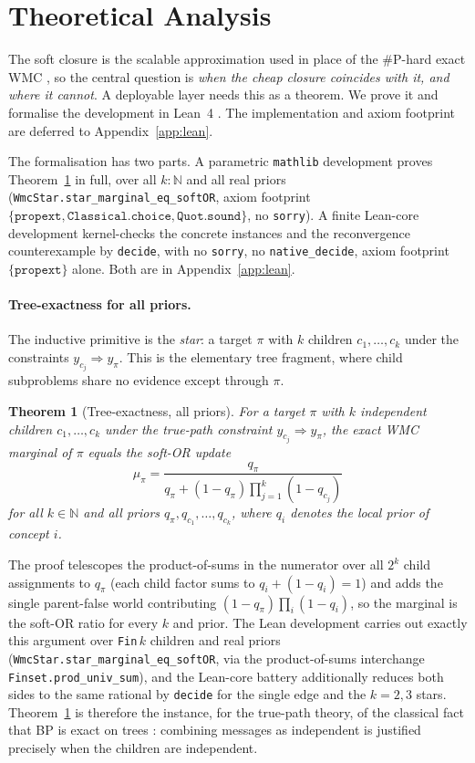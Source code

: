 \documentclass[letterpaper]{article}
\newtheorem{theorem}{Theorem}
\begin{document}
\section{Theoretical Analysis}\label{sec:lean}

The soft closure is the scalable approximation used in place of the \#P-hard exact WMC \citep{chavira2008wmc}, so the central question is \emph{when the cheap closure coincides with it, and where it cannot}. A deployable layer needs this as a theorem. We prove it and formalise the development in Lean~4 \citep{demoura2021lean}. The implementation and axiom footprint are deferred to Appendix~\ref{app:lean}.

The formalisation has two parts. A parametric \texttt{mathlib} development proves
Theorem~\ref{thm:star} in full, over all $k:\mathbb{N}$ and all real priors
(\texttt{WmcStar.star\_marginal\_eq\_softOR}, axiom footprint
$\{\texttt{propext},\texttt{Classical.choice},\texttt{Quot.sound}\}$, no \texttt{sorry}). A
finite Lean-core development kernel-checks the concrete instances and the reconvergence
counterexample by \texttt{decide}, with no \texttt{sorry}, no \texttt{native\_decide}, axiom
footprint $\{\texttt{propext}\}$ alone. Both are in Appendix~\ref{app:lean}.

\paragraph{Tree-exactness for all priors.}
The inductive primitive is the \emph{star}: a target $\pi$ with $k$ children $c_1,\dots,c_k$ under the constraints $y_{c_j}\!\Rightarrow\!y_\pi$. This is the elementary tree fragment, where child subproblems share no evidence except through $\pi$.

\begin{theorem}[Tree-exactness, all priors]\label{thm:star}
For a target $\pi$ with $k$ independent children $c_1,\dots,c_k$ under the true-path constraint $y_{c_j}\!\Rightarrow\!y_\pi$, the exact WMC marginal of $\pi$ equals the soft-OR update
\[
\mu_\pi=\frac{q_\pi}{q_\pi+(1-q_\pi)\prod_{j=1}^{k}(1-q_{c_j})}
\]
for all $k\in\mathbb{N}$ and all priors $q_\pi,q_{c_1},\dots,q_{c_k}$, where $q_i$ denotes the local prior of concept $i$.
\end{theorem}

The proof telescopes the product-of-sums in the numerator over all $2^k$ child assignments to $q_\pi$ (each child factor sums to $q_i+(1-q_i)=1$) and adds the single parent-false world contributing $(1-q_\pi)\prod_i(1-q_i)$, so the marginal is the soft-OR ratio for every $k$ and prior. The Lean development carries out exactly this argument over \texttt{Fin}\,$k$ children and real priors (\texttt{WmcStar.star\_marginal\_eq\_softOR}, via the product-of-sums interchange \texttt{Finset.prod\_univ\_sum}), and the Lean-core battery additionally reduces both sides to the same rational by \texttt{decide} for the single edge and the $k{=}2,3$ stars. Theorem~\ref{thm:star} is therefore the instance, for the true-path theory, of the classical fact that BP is exact on trees \citep{pearl1988probabilistic}: combining messages as independent is justified precisely when the children are independent.
\end{document}
